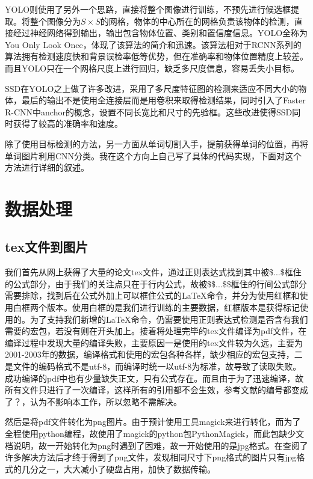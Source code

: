 \documentclass[12pt]{article}
\begin{document}
YOLO\cite{yolo}则使用了另外一个思路，直接将整个图像进行训练，不预先进行候选框提取。将整个图像分为$S \times S$的网格，物体的中心所在的网格负责该物体的检测，直接经过神经网络得到输出，输出包含物体位置、类别和置信度信息。YOLO全称为You Only Look Once，体现了该算法的简介和迅速。该算法相对于RCNN系列的算法拥有检测速度快和背景误检率低等优势，但在准确率和物体位置精度上较差。而且YOLO只在一个网格尺度上进行回归，缺乏多尺度信息，容易丢失小目标。

SSD\cite{ssd}在YOLO之上做了许多改进，采用了多尺度特征图的检测来适应不同大小的物体，最后的输出不是使用全连接层而是用卷积来取得检测结果，同时引入了Faster R-CNN中anchor的概念，设置不同长宽比和尺寸的先验框。这些改进使得SSD同时获得了较高的准确率和速度。

除了使用目标检测的方法，另一方面从单词切割入手，提前获得单词的位置，再将单词图片利用CNN分类。我在这个方向上自己写了具体的代码实现，下面对这个方法进行详细的叙述。



\section{数据处理}

\subsection{tex文件到图片}
\noindent

我们首先从网上获得了大量的论文tex文件，通过正则表达式找到其中被\$...\$框住的公式部分，由于我们的关注点只在于行内公式，故被\$\$...\$\$框住的行间公式部分需要排除，找到后在公式外加上可以框住公式的LaTeX命令，并分为使用红框和使用白框两个版本。使用白框的是我们进行训练的主要数据，红框版本是获得标记使用的。为了支持我们新增的LaTeX命令，仍需要使用正则表达式检测是否含有我们需要的宏包，若没有则在开头加上。接着将处理完毕的tex文件编译为pdf文件，在编译过程中发现大量的编译失败，主要原因一是使用的tex文件较为久远，主要为2001-2003年的数据，编译格式和使用的宏包各种各样，缺少相应的宏包支持，二是文件的编码格式不是utf-8，而编译时统一以utf-8为标准，故导致了读取失败。成功编译的pdf中也有少量缺失正文，只有公式存在。而且由于为了迅速编译，故所有文件只进行了一次编译，这样所有的引用都不会生效，参考文献的编号都变成了？，认为不影响本工作，所以忽略不需解决。

然后是将pdf文件转化为png图片。由于预计使用工具magick来进行转化，而为了全程使用python编程，故使用了magick的python包PythonMagick，而此包缺少文档说明，故一开始转化为png时遇到了困难，故一开始使用的是jpg格式。在查阅了许多解决方法后才终于得到了png文件，发现相同尺寸下png格式的图片只有jpg格式的几分之一，大大减小了硬盘占用，加快了数据传输。
\end{document}

